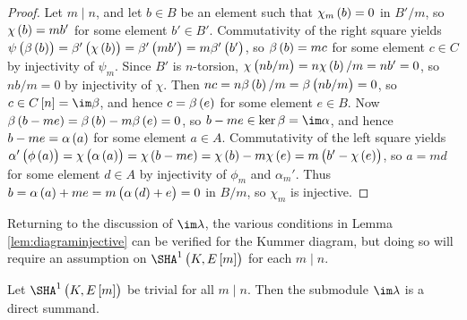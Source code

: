 \begin{proof}
Let $ m \mid n $, and let $ b \in B $ be an element such that $ \chi_m\br{b} = 0 $ in $ B' / m $, so $ \chi\br{b} = mb' $ for some element $ b' \in B' $. Commutativity of the right square yields $ \psi\br{\beta\br{b}} = \beta'\br{\chi\br{b}} = \beta'\br{mb'} = m\beta'\br{b'} $, so $ \beta\br{b} = mc $ for some element $ c \in C $ by injectivity of $ \psi_m $. Since $ B' $ is $ n $-torsion, $ \chi\br{nb / m} = n\chi\br{b} / m = nb' = 0 $, so $ nb / m = 0 $ by injectivity of $ \chi $. Then $ nc = n\beta\br{b} / m = \beta\br{nb / m} = 0 $, so $ c \in C\sbr{n} = \im \beta $, and hence $ c = \beta\br{e} $ for some element $ e \in B $. Now $ \beta\br{b - me} = \beta\br{b} - m\beta\br{e} = 0 $, so $ b - me \in \ker \beta = \im \alpha $, and hence $ b - me = \alpha\br{a} $ for some element $ a \in A $. Commutativity of the left square yields $ \alpha'\br{\phi\br{a}} = \chi\br{\alpha\br{a}} = \chi\br{b - me} = \chi\br{b} - m\chi\br{e} = m\br{b' - \chi\br{e}} $, so $ a = md $ for some element $ d \in A $ by injectivity of $ \phi_m $ and $ \alpha_m' $. Thus $ b = \alpha\br{a} + me = m\br{\alpha\br{d} + e} = 0 $ in $ B / m $, so $ \chi_m $ is injective.
\end{proof}

Returning to the discussion of $ \im \lambda $, the various conditions in Lemma \ref{lem:diagraminjective} can be verified for the Kummer diagram, but doing so will require an assumption on $ \Sha[K, E\sbr{m}] $ for each $ m \mid n $.

\begin{proposition}
\label{prop:globalsummand}
Let $ \Sha[K, E\sbr{m}] $ be trivial for all $ m \mid n $. Then the submodule $ \im \lambda $ is a direct summand.
\end{proposition}

